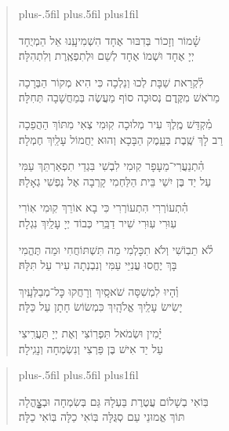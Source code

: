 \documentclass[twoside, openany, parskip=half, 11pt]{book}
\begin{document}
\begin{quote}
\leftskip=0pt plus-.5fil
\rightskip=0pt plus.5fil
\parfillskip=0pt plus1fil


\lechadodi

שָׁ֗מוֹר וְזָכוֹר בְּדִבּוּר אֶחָד \hfill
הִשְׁמִיעָֽנוּ אֵל הַמְיֻחָד \\
יְיָ אֶחָד וּשְׁמוֹ אֶחָד \hfill
לְשֵׁם וּלְתִפְאֶֽרֶת וְלִתְהִלָּה׃

\lechadodi

לִ֗קְרַאת שַׁבָּת לְכוּ וְנֵלְכָה \hfill
כִּי הִיא מְקוֹר הַבְּרָכָה \\
מֵרֹאשׁ מִקֶּֽדֶם נְסוּכָה \hfill
סוֹף מַעֲשֶׂה בְּמַחֲשָׁבָה תְּחִלָּה׃

\lechadodi

מִ֗קְדַּשׁ מֶֽלֶךְ עִיר מְלוּכָה \hfill
קֽוּמִי צְאִי מִתּוֹךְ הַהֲפֵכָה \\
רַב לָךְ שֶֽׁבֶת בְּעֵֽמֶק הַבָּכָא \hfill
וְהוּא יַחֲמוֹל עָלַֽיִךְ חֶמְלָה׃

\lechadodi

הִ֗תְנַעֲרִי־מֵעָפָר קֽוּמִי \hfill
לִבְשִׁי בִּגְדֵי תִפְאַרְתֵּךְ עַמִּי \\
עַל יַד בֶּן יִשַׁי בֵּית הַלַּחְמִי \hfill
קָרְבָה אֶל נַפְשִׁי גְאָלָהּ׃

\lechadodi

הִ֗תְעוֹרְרִי הִתְעוֹרְרִי \hfill
כִּי בָא אוֹרֵךְ קֽוּמִי אֽוֹרִי \\
עֽוּרִי עֽוּרִי שִׁיר דַבֵּֽרִי \hfill
כְּבוֹד יְיָ עָלַֽיִךְ נִגְלָה׃

\lechadodi

לֹ֗א תֵבֽוֹשִׁי וְלֹא תִכָּלְמִי \hfill
מַה תִּשְׁתּוֹחֲחִי וּמַה תֶּהֱמִי \\
בָּךְ יֶחֱסוּ עֲנִיֵּי עַמִּי \hfill
וְנִבְנְתָה עִיר עַל תִּלָּהּ׃

\lechadodi

וְ֗הָיוּ לִמְשִׁסָּה שֹׁאסָֽיִךְ \hfill
וְרָחֲקוּ כׇּל־מְבַלְּעָֽיִךְ \\
יָשִׂישׂ עָלַֽיִךְ אֱלֹהָֽיִךְ \hfill
כִּמְשׂוֹשׂ חָתָן עַל כַּלָּה׃

\lechadodi

יָ֗מִין וּשְׂמֹאל תִּפְרֽוֹצִי \hfill
וְאֶת יְיָ תַּעֲרִֽיצִי \\
עַל יַד אִישׁ בֶּן פַּרְצִי \hfill
וְנִשְׂמְחָה וְנָגִֽילָה׃

\lechadodi

\end{quote}



\begin{quote}
\leftskip=0pt plus-.5fil
\rightskip=0pt plus.5fil
\parfillskip=0pt plus1fil

בּֽוֹאִי בְשָׁלוֹם עֲטֶרֶת בַּעְלָהּ \hfill
גַּם בְּשִׂמְחָה וּבְצׇׇׇׇׇׇׇׇׇהֳלָה \\
תּוֹךְ אֱמוּנֵי עַם סְגֻּלָּה \hfill
בּֽוֹאִי כַלָּה בּֽוֹאִי כַלָּה׃

\lechadodi

\end{quote}
\end{document}
